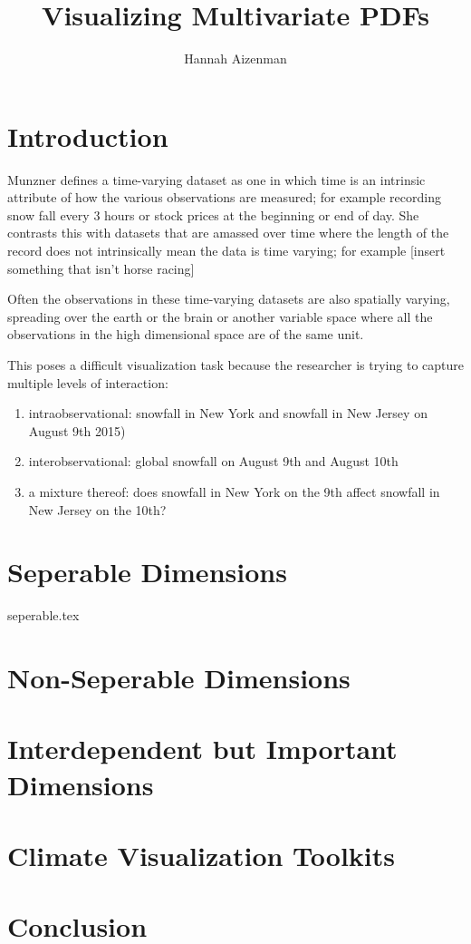 \documentclass[letterpaper,onecolumn,titlepage]{Ythesis}
\title{Visualizing Multivariate PDFs}
\author{Hannah Aizenman}
\begin{document}
\makefrontmatter

\section{Introduction}

Munzner \cite{Munzner14ii} defines a time-varying dataset as one in which time is an intrinsic attribute of how the various observations are measured; for example recording snow fall every 3 hours or stock prices at the beginning or end of day. She contrasts this with datasets that are amassed over time where the length of the record does not intrinsically mean the data is time varying; for example [insert something that isn't horse racing] 

Often the observations in these time-varying datasets are also spatially varying, spreading over the earth or the brain or another variable space where all the observations in the high dimensional space are of the same unit. %

This poses a difficult visualization task because the researcher is trying to capture multiple levels of interaction:
\begin{enumerate}
	\item intraobservational: snowfall in New York and snowfall in New Jersey on August 9th 2015)
	\item interobservational: global snowfall on August 9th and August 10th
	\item a mixture thereof: does snowfall in New York on the 9th affect snowfall in New Jersey on the 10th?
\end{enumerate}

\section{Seperable Dimensions}
{seperable.tex}
\section{Non-Seperable Dimensions}
\section{Interdependent but Important Dimensions}
\section{Climate Visualization Toolkits}

\section{Conclusion}
\label{sec:conclusion}


\pagebreak


\end{document}
